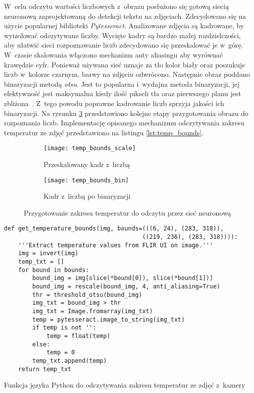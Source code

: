 W~celu odczytu wartości liczbowych z~obrazu posłużono się gotową siecią
neuronową zaprojektowaną do detekcji tekstu na zdjęciach.
Zdecydowano się na użycie popularnej biblioteki \emph{Pytesseract}.
Analizowane zdjęcia są kadrowane, by wyizolować odczytywane liczby.
Wycięte kadry są bardzo małej rozdzielczości, aby ułatwić sieci rozpoznawanie
liczb zdecydowano się przeskalować je w~górę.
W~czasie skalowania włączono mechanizm anty aliasingu aby wyrównać krawędzie
cyfr.
Ponieważ używana sieć uznaje za tło kolor biały oraz poszukuje liczb w~kolorze
czarnym, barwy na zdjęciu odwrócono.
Następnie obraz poddano binaryzacji metodą \emph{otsu}.
Jest to popularna i~wydajna metoda binaryzacji, jej efektywność jest
maksymalna kiedy ilość pikseli tła oraz pierwszego planu jest
zbliżona~\cite{sezgin}.
Z~tego powodu poprawne kadrowanie liczb sprzyja jakości ich binaryzacji.
Na rysunku \ref{fig:temp_bounds} przedstawiono kolejne etapy przygotowania
obrazu do rozpoznania liczb.
Implementację opisanego mechanizmu odczytywania zakresu temperatur ze zdjęć
przedstawiono na listingu \ref{lst:temp_bounds}.
\begin{figure}[htbp]
	\centering
	\begin{subfigure}{0.45\textwidth}
		\centering
		\texttt{[image: temp\_bounds\_scale]}
		\caption{Przeskalowany kadr z~liczbą}
		\label{fig:temp_bounds_scale}
	\end{subfigure}
	\hspace{0.5cm}
	\begin{subfigure}{0.45\textwidth}
		\centering
		\texttt{[image: temp\_bounds\_bin]}
		\caption{Kadr z~liczbą po binaryzacji}
		\label{fig:temp_bounds_bin}
	\end{subfigure}
	\caption{Przygotowanie zakresu temperatur do odczytu przez sieć neuronową}
	\label{fig:temp_bounds}
\end{figure}

\begin{listing}[htbp]
\begin{verbatim}
def get_temperature_bounds(img, bounds=(((6, 24), (283, 318)),
                                       ((219, 236), (283, 318)))):
    '''Extract temperature values from FLIR UI on image.'''
    img = invert(img)
    temp_txt = []
    for bound in bounds:
        bound_img = img[slice(*bound[0]), slice(*bound[1])]
        bound_img = rescale(bound_img, 4, anti_aliasing=True)
        thr = threshold_otsu(bound_img)
        img_txt = bound_img > thr
        img_txt = Image.fromarray(img_txt)
        temp = pytesseract.image_to_string(img_txt)
        if temp is not '': 
            temp = float(temp)
        else:
            temp = 0
        temp_txt.append(temp)
    return temp_txt
\end{verbatim}
\caption{Funkcja języka Python do odczytywania zakresu temperatur ze zdjęć
         z~kamery}
\label{lst:temp_bounds}
\end{listing}

